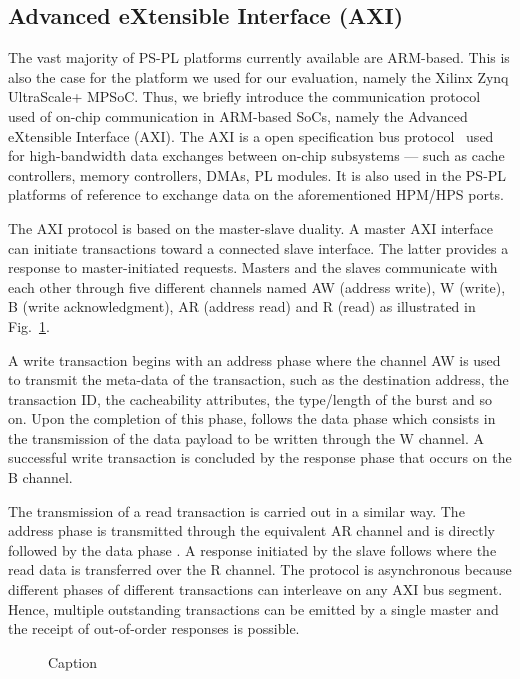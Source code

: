 \subsection{Advanced eXtensible Interface (AXI)}
\label{subsec:axi_transaction_scheme}
The vast majority of PS-PL platforms currently available are
ARM-based. This is also the case for the platform we used for our
evaluation, namely the Xilinx Zynq UltraScale+ MPSoC. Thus, we briefly
introduce the communication protocol used of on-chip communication in
ARM-based SoCs, namely the Advanced eXtensible Interface (AXI). The
AXI is a open specification bus protocol~\cite{ARM-AXI} used for
high-bandwidth data exchanges between on-chip subsystems --- such as
cache controllers, memory controllers, DMAs, PL modules. It is also
used in the PS-PL platforms of reference to exchange data on the
aforementioned HPM/HPS ports.

The AXI protocol is based on the master-slave duality. A master AXI
interface can initiate transactions toward a connected slave
interface.  The latter provides a response to master-initiated
requests.  Masters and the slaves communicate with each other through
five different channels named AW (address write), W (write), B (write
acknowledgment), AR (address read) and R (read) as illustrated in
Fig.~\ref{fig:axi_transaction_scheme_figure}.

A write transaction begins with an address phase  where the
channel AW is used to transmit the meta-data of the transaction, such
as the destination address, the transaction ID, the cacheability
attributes, the type/length of the burst and so on.  Upon the
completion of this phase, follows the data phase  which
consists in the transmission of the data payload to be written through
the W channel.  A successful write transaction is concluded by the
response phase  that occurs on the B channel.

The transmission of a read transaction is carried out in a similar
way.  The address phase  is transmitted through the
equivalent AR channel and is directly followed by the data phase
.  A response initiated by the slave follows where the
read data is transferred over the R channel. The protocol is
asynchronous because different phases of different transactions can
interleave on any AXI bus segment. Hence, multiple outstanding
transactions can be emitted by a single master and the receipt of
out-of-order responses is possible.

\begin{figure}
  \centering
  
  \caption{Caption}
  \label{fig:axi_transaction_scheme_figure}
\end{figure}

